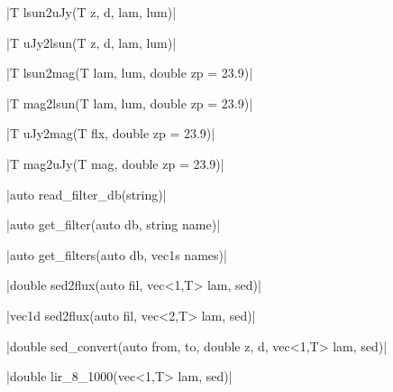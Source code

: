 \item \cppinline|T lsun2uJy(T z, d, lam, lum)| 

\cppinline|T uJy2lsun(T z, d, lam, lum)| 

\item \cppinline|T lsun2mag(T lam, lum, double zp = 23.9)| 

\cppinline|T mag2lsun(T lam, lum, double zp = 23.9)| 

\item \cppinline|T uJy2mag(T flx, double zp = 23.9)| 

\cppinline|T mag2uJy(T mag, double zp = 23.9)| 

\item \cppinline|auto read_filter_db(string)| 

\item \cppinline|auto get_filter(auto db, string name)| 

\cppinline|auto get_filters(auto db, vec1s names)| 

\item \cppinline|double sed2flux(auto fil, vec<1,T> lam, sed)| 

\cppinline|vec1d sed2flux(auto fil, vec<2,T> lam, sed)|

\item \cppinline|double sed_convert(auto from, to, double z, d, vec<1,T> lam, sed)| 

\item \cppinline|double lir_8_1000(vec<1,T> lam, sed)| 
